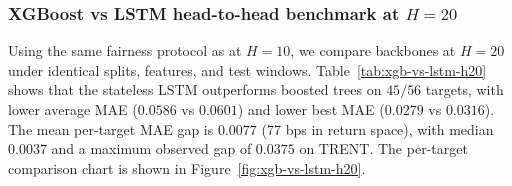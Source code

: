 \documentclass[12pt,a4paper,titlepage]{article}
\begin{document}
\begin{table}[htbp]
\centering
\small
\caption{Representative Baseline A vs B vs Proposed comparison at \(H=20\) under the boosted-tree backbone.}
\label{tab:baseline-abc-h20}
\end{table}

\subsubsection{XGBoost vs LSTM head-to-head benchmark at \(H=20\)}
\label{sec:xgb-vs-lstm-h20}

Using the same fairness protocol as at \(H=10\), we compare backbones at \(H=20\) under identical splits, features, and test windows. Table~\ref{tab:xgb-vs-lstm-h20} shows that the stateless LSTM outperforms boosted trees on \(45/56\) targets, with lower average MAE (\(0.0586\) vs \(0.0601\)) and lower best MAE (\(0.0279\) vs \(0.0316\)). The mean per-target MAE gap is \(0.0077\) (77 bps in return space), with median \(0.0037\) and a maximum observed gap of \(0.0375\) on TRENT. The per-target comparison chart is shown in Figure~\ref{fig:xgb-vs-lstm-h20}.
\end{document}
